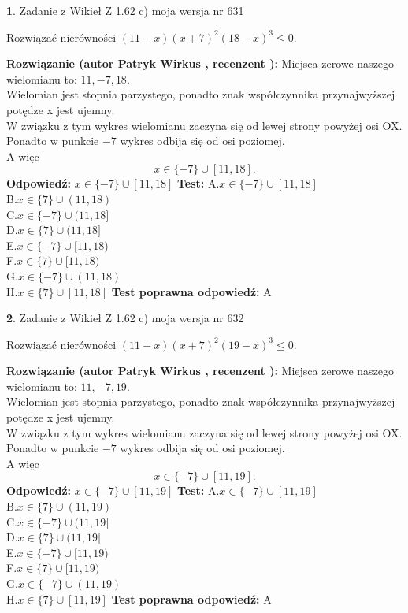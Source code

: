 \documentclass[12pt, a4paper]{article}
\theoremstyle{definition} %
\newtheorem{zad}{}
\newcommand{\zadStart}[1]{\begin{zad}#1\newline}
\newcommand{\zadStop}{\end{zad}}
\newcommand{\rozwStart}[2]{\noindent \textbf{Rozwiązanie (autor #1 , recenzent #2): }\newline}
\newcommand{\rozwStop}{\newline}
\newcommand{\odpStart}{\noindent \textbf{Odpowiedź:}\newline}
\newcommand{\odpStop}{\newline}
\newcommand{\testStart}{\noindent \textbf{Test:}\newline}
\newcommand{\testStop}{\newline}
\newcommand{\kluczStart}{\noindent \textbf{Test poprawna odpowiedź:}\newline}
\newcommand{\kluczStop}{\newline}
\begin{document}
\zadStart{Zadanie z Wikieł Z 1.62 c) moja wersja nr 631}

Rozwiązać nierówności $(11-x)(x+7)^{2}(18-x)^{3}\le0$.
\zadStop
\rozwStart{Patryk Wirkus}{}
Miejsca zerowe naszego wielomianu to: $11, -7, 18$.\\
Wielomian jest stopnia parzystego, ponadto znak współczynnika przy\linebreak najwyższej potędze x jest ujemny.\\ W związku z tym wykres wielomianu zaczyna się od lewej strony powyżej osi OX.\\
Ponadto w punkcie $-7$ wykres odbija się od osi poziomej.\\
A więc $$x \in \{-7\} \cup [11,18].$$
\rozwStop
\odpStart
$x \in \{-7\} \cup [11,18]$
\odpStop
\testStart
A.$x \in \{-7\} \cup [11,18]$\\
B.$x \in \{7\} \cup (11,18)$\\
C.$x \in \{-7\} \cup (11,18]$\\
D.$x \in \{7\} \cup (11,18]$\\
E.$x \in \{-7\} \cup [11,18)$\\
F.$x \in \{7\} \cup [11,18)$\\
G.$x \in \{-7\} \cup (11,18)$\\
H.$x \in \{7\} \cup [11,18]$
\testStop
\kluczStart
A
\kluczStop



\zadStart{Zadanie z Wikieł Z 1.62 c) moja wersja nr 632}

Rozwiązać nierówności $(11-x)(x+7)^{2}(19-x)^{3}\le0$.
\zadStop
\rozwStart{Patryk Wirkus}{}
Miejsca zerowe naszego wielomianu to: $11, -7, 19$.\\
Wielomian jest stopnia parzystego, ponadto znak współczynnika przy\linebreak najwyższej potędze x jest ujemny.\\ W związku z tym wykres wielomianu zaczyna się od lewej strony powyżej osi OX.\\
Ponadto w punkcie $-7$ wykres odbija się od osi poziomej.\\
A więc $$x \in \{-7\} \cup [11,19].$$
\rozwStop
\odpStart
$x \in \{-7\} \cup [11,19]$
\odpStop
\testStart
A.$x \in \{-7\} \cup [11,19]$\\
B.$x \in \{7\} \cup (11,19)$\\
C.$x \in \{-7\} \cup (11,19]$\\
D.$x \in \{7\} \cup (11,19]$\\
E.$x \in \{-7\} \cup [11,19)$\\
F.$x \in \{7\} \cup [11,19)$\\
G.$x \in \{-7\} \cup (11,19)$\\
H.$x \in \{7\} \cup [11,19]$
\testStop
\kluczStart
A
\kluczStop
\end{document}
